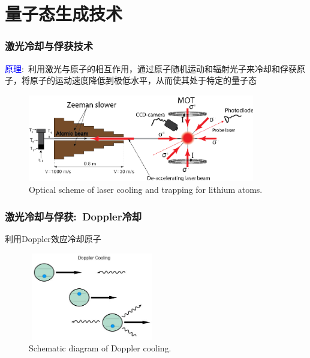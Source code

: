 \section{量子态生成技术}
\begin{frame}
    \frametitle{激光冷却与俘获技术}
    \textcolor{blue}{原理}:~利用激光与原子的相互作用，通过原子随机运动和辐射光子来冷却和俘获原子，将原子的运动速度降低到极低水平，从而使其处于特定的量子态
    \begin{figure}
        \centering
                \includegraphics[height=1.5in, width=3.9in, viewport=0 0 472 179,clip]{Figures/Optical-scheme-of-laser-cooling-and-trapping-for-lithium-atoms.png}
		\caption{\tiny{\textrm{Optical scheme of laser cooling and trapping for lithium atoms.}}}
		\label{Fig:Optical-scheme-of-laser-cooling-and-trapping-for-lithium-atoms}
    \end{figure}
	    \vskip -10pt
    {\fontsize{7.5pt}{5.2pt}}
\end{frame}

\begin{frame}
    \frametitle{激光冷却与俘获:~\textrm{Doppler}冷却}
	    利用\textrm{Doppler}效应冷却原子
    \begin{figure}
        \centering
                \includegraphics[height=1.5in, width=2.2in, viewport=0 0 429 307,clip]{Figures/Atom-MOT-and-laser-cooling_Doppler_cooling.png}
		\caption{\tiny{\textrm{Schematic diagram of Doppler cooling.}}}
		\label{Fig:Atom-MOT-and-laser-cooling_Doppler_cooling}
    \end{figure}
	    {\fontsize{8.5pt}{5.2pt}\selectfont{将激光的频率调到略低于原子的跃迁频率:~
		    \begin{itemize}
			    \item 当激光束与原子相向运动，其频率略微蓝移，因此原子将吸收光子
		    \item 当原子与激光束背向运动，将感受到红移后的激光频率，而释放光子
		    \end{itemize}
	    最终使得原子损失动能，达到冷却的目的}}
\end{frame}

